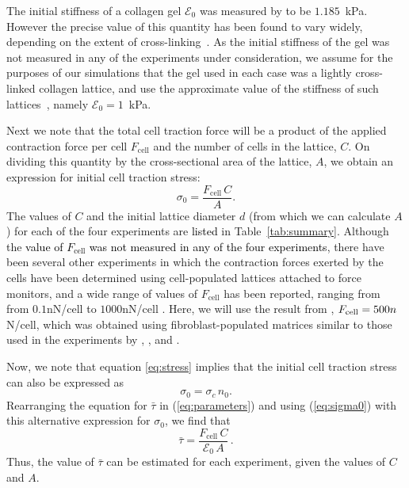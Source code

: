 The initial stiffness of a collagen gel $\mathcal{E}_{0}$ was measured by \citet{Knapp1997,Knapp1999} to be $1.185$~kPa. However the precise value of this quantity has been found to vary widely, depending on the extent of cross-linking~\citep{Discher2005}. As the initial stiffness of the gel was not measured in any of the experiments under consideration, we assume for the purposes of our simulations that the gel used in each case was a lightly cross-linked collagen lattice, and use the approximate value of the stiffness of such lattices~\citep{Discher2005}, namely $\mathcal{E}_{0}=1$~kPa.

Next we note that the total cell traction force will be a product of the applied contraction force per cell $F_\text{cell}$ and the number of cells in the lattice, $C$. On dividing this quantity by the cross-sectional area of the lattice, $A$, we obtain an expression for initial cell traction stress:
\begin{equation}
\sigma_0 = \frac{F_\text{cell} \, C}{A}.
\label{eq:sigma0}
\end{equation}
The values of $C$ and the initial lattice diameter $d$ (from which we can calculate $A$) for each of the four experiments are \textcolor{black}{listed} in Table~\ref{tab:summary}. Although the \textcolor{black}{value of $F_\text{cell}$ was not measured in any of the four experiments}, there have been several other experiments in which the contraction forces exerted by the cells have been determined using cell-populated lattices attached to force monitors, and a wide range of values of $F_\text{cell}$ has been reported, ranging from from $0.1$nN/cell \citep{Eastwood1996} to $1000$nN/cell \citep{Wakatsuki2000}. Here, we will use the result from \citet{Kolodney1992}, $F_{\rm cell}=500n$N/cell, which was obtained using fibroblast-populated matrices similar to those used in the experiments by \citet{Bell1979}, \citet{Talas1997}, \citet{Feng2003} and \citet{Guidry1985}.

Now, we note that equation \eqref{eq:stress} implies that the initial cell traction stress can also be expressed as
\[
\sigma_{0} = \sigma_c \, n_0.
\]
Rearranging  the equation for $\bar{\tau}$ in (\ref{eq:parameters}) and using (\ref{eq:sigma0}) with this alternative expression for $\sigma_{0}$, we find that
\begin{equation}
\bar{\tau}=\frac{F_\text{cell} \, C}{\mathcal{E}_{0}\,A}\,.
\label{eq:stiffness}
\end{equation}
Thus, the value of $\bar{\tau}$ can be estimated for each experiment, given the values of $C$ and $A$.

